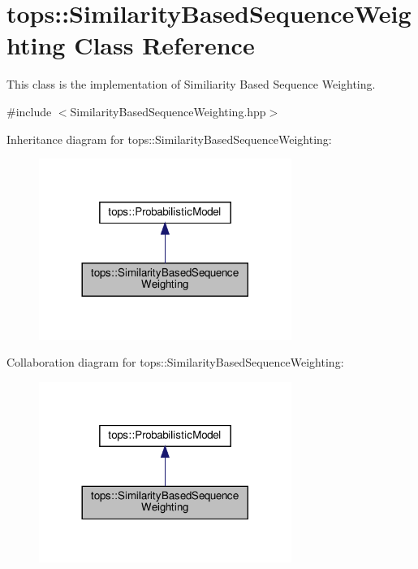 \hypertarget{classtops_1_1SimilarityBasedSequenceWeighting}{}\section{tops\+:\+:Similarity\+Based\+Sequence\+Weighting Class Reference}
\label{classtops_1_1SimilarityBasedSequenceWeighting}


This class is the implementation of Similiarity Based Sequence Weighting.  




{\ttfamily \#include $<$Similarity\+Based\+Sequence\+Weighting.\+hpp$>$}



Inheritance diagram for tops\+:\+:Similarity\+Based\+Sequence\+Weighting\+:
\nopagebreak
\begin{figure}[H]
\begin{center}
\leavevmode
\includegraphics[width=233pt]{classtops_1_1SimilarityBasedSequenceWeighting__inherit__graph}
\end{center}
\end{figure}


Collaboration diagram for tops\+:\+:Similarity\+Based\+Sequence\+Weighting\+:
\nopagebreak
\begin{figure}[H]
\begin{center}
\leavevmode
\includegraphics[width=233pt]{classtops_1_1SimilarityBasedSequenceWeighting__coll__graph}
\end{center}
\end{figure}

